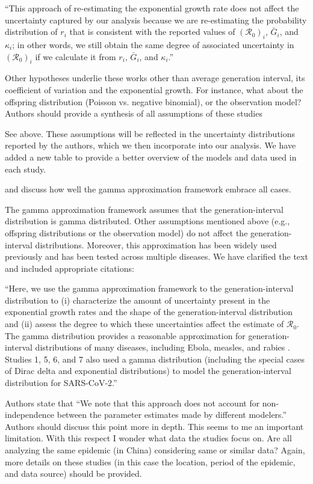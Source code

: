 \documentclass[12pt]{article}
\newcommand{\Ro}{\ensuremath{{\mathcal R}_{0}}\xspace}
\newcommand{\revtext}{\textsf}
\begin{document}
``This approach of re-estimating the exponential growth rate does not affect the uncertainty captured by our analysis because we are re-estimating the probability distribution of $r_i$ that is consistent with the reported values of $(\Ro)_i$, $\bar G_i$, and $\kappa_i$;
in other words, we still obtain the same degree of associated uncertainty in $(\Ro)_i$ if we calculate it from $r_i$, $\bar G_i$, and $\kappa_i$.''

\revtext{Other hypotheses underlie these works other than average generation interval, its coefficient of variation and the exponential growth. For instance, what about the offspring distribution (Poisson vs. negative binomial), or the observation model? Authors should provide a synthesis of all assumptions of these studies}

See above. These assumptions will be reflected in the uncertainty distributions reported by the authors, which we then incorporate into our analysis. We have added a new table to provide a better overview of the models and data used in each study.

\revtext{and discuss how well the gamma approximation framework embrace all cases.}

The gamma approximation framework assumes that the generation-interval distribution is gamma distributed.
Other assumptions mentioned above (e.g., offspring distributions or the observation model) do not affect the generation-interval distributions.
Moreover, this approximation has been widely used previously and has been tested across multiple diseases.
We have clarified the text and included appropriate citations:

``Here, we use the gamma approximation framework to the generation-interval distribution \citep{nishiura2009transmission, mcbryde2009early, roberts2011early, trichereau2012estimation, nishiura2015theoretical, park2019practical} to (i) characterize the amount of uncertainty present in the exponential growth rates and the shape of the generation-interval distribution and (ii) assess the degree to which these uncertainties affect the estimate of \Ro.
The gamma distribution provides a reasonable approximation for generation-interval distributions of many diseases, including Ebola, measles, and rabies \citep{park2019practical}.
Studies 1, 5, 6, and 7 also used a gamma distribution (including the special cases of Dirac delta and exponential distributions) to model the generation-interval distribution for SARS-CoV-2.''

\revtext{
Authors state that “We note that this approach does not account for non- independence between the parameter estimates made by different modelers.” Authors should discuss this point more in depth. This seems to me an important limitation. With this respect I wonder what data the studies focus on. Are all analyzing the same epidemic (in China) considering same or similar data? Again, more details on these studies (in this case the location, period of the epidemic, and data source) should be provided.}
\end{document}
